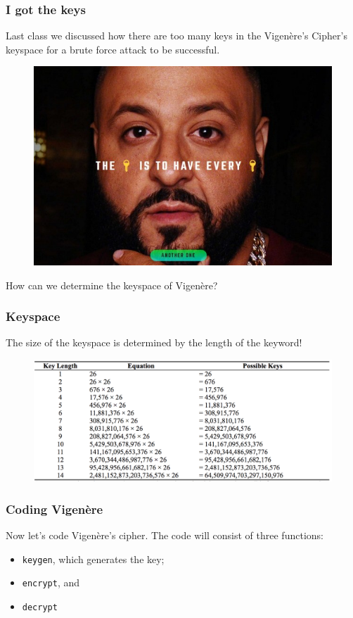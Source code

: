 \documentclass{beamer}
\newcommand{\<}{\langle}
\renewcommand{\>}{\rangle}
\begin{document}
\begin{frame}
\frametitle{I got the keys}

Last class we discussed how there are too many keys in the Vigen\`{e}re's Cipher's keyspace for a brute force attack to be successful.
\begin{figure}
\includegraphics[scale=.3]{IMG/keys.jpg}
\end{figure}
How can we determine the keyspace of Vigen\`{e}re?
\end{frame}


\begin{frame}
\frametitle{Keyspace}

The size of the keyspace is determined by the length of the keyword!

\begin{figure}
\includegraphics[scale=.4]{IMG/keyspace.png}
\end{figure}
\end{frame}


\begin{frame}[fragile]
\frametitle{Coding Vigen\`{e}re}

Now let's code Vigen\`{e}re's cipher. The code will consist of three functions:
\begin{itemize}
\item \verb|keygen|, which generates the key;
\item \verb|encrypt|, and
\item\verb|decrypt|
\end{itemize}
\end{frame}
\end{document}
